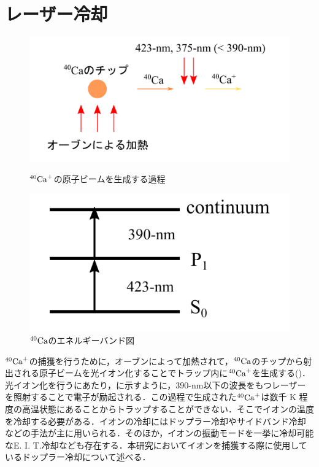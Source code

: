 \section{レーザー冷却\cite{URABE}\cite{Wineland_1979}}
\begin{figure}[h]
	\begin{minipage}{0.5\linewidth}
		\begin{center}
			\includegraphics[width = 0.9\columnwidth]{./theory/figure/general_Ca+.png}
			\caption{$^{40}{\rm Ca}^{+}$の原子ビームを生成する過程}
			\label{fig:general_Ca+}
		\end{center}
	\end{minipage}
	\begin{minipage}{0.5\linewidth}
		\begin{center}
			\includegraphics[width = 0.9\columnwidth]{./theory/figure/Ca_energy.png}
			\caption{$^{40}{\rm Ca}$のエネルギーバンド図}
			\label{fig:Ca_energy}
		\end{center}
	\end{minipage}
\end{figure}

$^{40}{\rm Ca}^{+}$の捕獲を行うために，オーブンによって加熱されて，$^{40}{\rm Ca}$のチップから射出される原子ビームを光イオン化することでトラップ内に$^{40}{\rm Ca}^{+}$を生成する()．光イオン化を行うにあたり，に示すように，390-nm以下の波長をもつレーザーを照射することで電子が励起される．この過程で生成された$^{40}{\rm Ca}^{+}$は数千 K 程度の高温状態にあることからトラップすることができない．そこでイオンの温度を冷却する必要がある．イオンの冷却にはドップラー冷却やサイドバンド冷却などの手法が主に用いられる．そのほか，イオンの振動モードを一挙に冷却可能なE. I. T.冷却\cite{Lechner_2016}なども存在する．本研究においてイオンを捕獲する際に使用しているドップラー冷却について述べる． 


